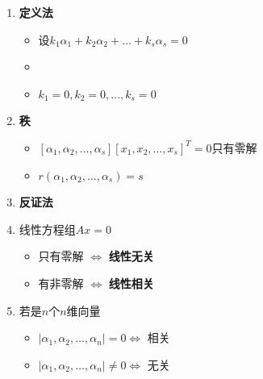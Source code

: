 \documentclass[./linear_algebra.tex]{subfiles}
\begin{document}
    \begin{enumerate}
        \item \textbf{定义法}
        \begin{itemize}
            \item 设$k_{1}\alpha_1 + k_{2}\alpha_2 + \dots + k_{s}\alpha_s = 0$
            \item \Downarrow {}
            \item $k_1 = 0, k_2 = 0, \dots, k_s = 0$
        \end{itemize}
        \item \textbf{秩}
        \begin{itemize}
            \item \Leftrightarrow $[\alpha_1, \alpha_2, \dots, \alpha_s][x_1, x_2, \dots, x_s]^T = 0$只有零解
            \item \Leftrightarrow {}$r(\alpha_1, \alpha_2, \dots, \alpha_s) = s$
        \end{itemize}
        \item \textbf{反证法}
        \item 线性方程组$Ax = 0$
        \begin{itemize}
            \item 只有零解 $\Leftrightarrow$ \textbf{线性无关}
            \item 有非零解 $\Leftrightarrow$ \textbf{线性相关}
        \end{itemize}
        \item 若是$n$个$n$维向量
        \begin{itemize}
            \item $|\alpha_1, \alpha_2, \dots, \alpha_n| = 0 \Leftrightarrow$ 相关
            \item $|\alpha_1, \alpha_2, \dots, \alpha_n| \neq 0 \Leftrightarrow$ 无关
        \end{itemize}
    \end{enumerate}
\end{document}
